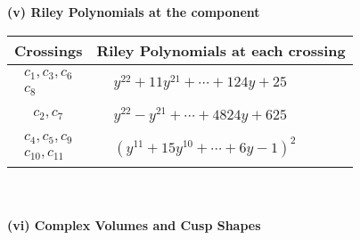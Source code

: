 \documentclass[1p]{elsarticle_modified}
\theoremstyle{definition}
\begin{document}
\newpage\renewcommand{\arraystretch}{1}
\flushleft \textbf{(v) Riley Polynomials at the component}\newline \\
\begin{tabular}{m{50pt}|m{274pt}}
Crossings & \hspace{64pt}Riley Polynomials at each crossing \\
\hline $$\begin{aligned}c_{1},c_{3},c_{6}\\c_{8}\end{aligned}$$&$\begin{aligned}
&y^{22}+11 y^{21}+\cdots+124 y+25
\end{aligned}$\\
\hline $$\begin{aligned}c_{2},c_{7}\end{aligned}$$&$\begin{aligned}
&y^{22}- y^{21}+\cdots+4824 y+625
\end{aligned}$\\
\hline $$\begin{aligned}c_{4},c_{5},c_{9}\\c_{10},c_{11}\end{aligned}$$&$\begin{aligned}
&(y^{11}+15 y^{10}+\cdots+6 y-1)^{2}
\end{aligned}$\\
\hline
\end{tabular}\\~\\
\newpage\flushleft \textbf{(vi) Complex Volumes and Cusp Shapes}
\end{document}
